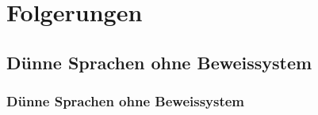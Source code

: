 \section{Folgerungen} 
\subsection{Dünne Sprachen ohne Beweissystem}

\begin{frame}
  \frametitle{Dünne Sprachen ohne Beweissystem}
\end{frame}
